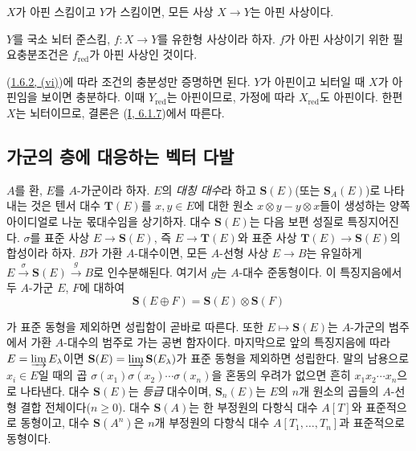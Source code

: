 \begin{corollary}[1.6.3]
\label{II.1.6.3-ko}
$X$가 아핀 스킴이고 $Y$가 스킴이면, 모든 사상 $X\to Y$는 아핀
사상이다.
\end{corollary}

\begin{proposition}[1.6.4]
\label{II.1.6.4-ko}
$Y$를 국소 뇌터 준스킴, $f:X\to Y$를 유한형 사상이라 하자. $f$가
아핀 사상이기 위한 필요충분조건은 $f_{\mathrm{red}}$가 아핀 사상인
것이다.
\end{proposition}

(\hyperref[II.1.6.2-ko]{1.6.2, (vi)})에 따라 조건의 충분성만 증명하면
된다. $Y$가 아핀이고 뇌터일 때 $X$가 아핀임을 보이면 충분하다. 이때
$Y_{\mathrm{red}}$는 아핀이므로, 가정에 따라 $X_{\mathrm{red}}$도
아핀이다. 한편 $X$는 뇌터이므로, 결론은
(\hyperref[I.6.1.7-ko]{I, 6.1.7})에서 따른다.

\subsection{가군의 층에 대응하는 벡터 다발}
\label{II.1.7-ko}

\begin{env}[1.7.1]
\label{II.1.7.1-ko}
$A$를 환, $E$를 $A$-가군이라 하자. $E$의 \emph{대칭 대수}라 하고
$\mathbf{S}(E)$(또는 $\mathbf{S}_A(E)$)로 나타내는 것은 텐서 대수
$\mathbf{T}(E)$를 $x,y\in E$에 대한 원소
$x\otimes y-y\otimes x$들이 생성하는 양쪽 아이디얼로 나눈 몫대수임을
상기하자. 대수 $\mathbf{S}(E)$는 다음 보편 성질로 특징지어진다.
$\sigma$를 표준 사상 $E\to\mathbf{S}(E)$, 즉
$E\to\mathbf{T}(E)$와 표준 사상
$\mathbf{T}(E)\to\mathbf{S}(E)$의 합성이라 하자. $B$가 가환
$A$-대수이면, 모든 $A$-선형 사상 $E\to B$는 유일하게
$E\xrightarrow{\sigma}\mathbf{S}(E)\xrightarrow{g}B$로 인수분해된다. 여기서
$g$는 $A$-대수 준동형이다. 이 특징지음에서 두 $A$-가군 $E$, $F$에
대하여
\[
  \mathbf{S}(E\oplus F)=\mathbf{S}(E)\otimes\mathbf{S}(F)
\]

가 표준 동형을 제외하면 성립함이 곧바로 따른다. 또한
$E\mapsto\mathbf{S}(E)$는 $A$-가군의 범주에서 가환 $A$-대수의 범주로
가는 공변 함자이다. 마지막으로 앞의 특징지음에 따라
$E=\varinjlim E_\lambda$이면
$\mathbf{S}(E)=\varinjlim\mathbf{S}(E_\lambda)$가 표준 동형을 제외하면
성립한다. 말의 남용으로 $x_i\in E$일 때의 곱
$\sigma(x_1)\sigma(x_2)\cdots\sigma(x_n)$을 혼동의 우려가 없으면 흔히
$x_1x_2\cdots x_n$으로 나타낸다. 대수 $\mathbf{S}(E)$는
\emph{등급} 대수이며, $\mathbf{S}_n(E)$는 $E$의 $n$개 원소의 곱들의
$A$-선형 결합 전체이다($n\geq 0$). 대수 $\mathbf{S}(A)$는 한 부정원의
다항식 대수 $A[T]$와 표준적으로 동형이고, 대수 $\mathbf{S}(A^n)$은
$n$개 부정원의 다항식 대수 $A[T_1,\ldots,T_n]$과 표준적으로 동형이다.
\end{env}

